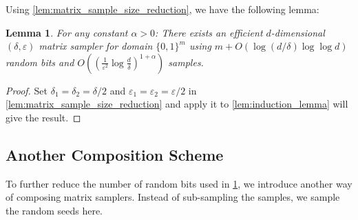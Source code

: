 \documentclass[10pt,a4paper]{article}
\newtheorem{lemma}[theorem]{Lemma}
\newcommand{\eps}{\varepsilon}
\newcommand{\1}{\mathbbm{1}}
\newcommand{\zo}{\{0, 1\}}
\begin{document}
Using \cref{lem:matrix_sample_size_reduction}, we have the following lemma:
\begin{lemma}
    \label{lem:sampler_without_replacement}
    For any constant $\alpha > 0$:
    There exists an efficient $d$-dimensional $(\delta, \eps)$ matrix sampler for domain $\zo^m$ using $m + O(\log(d / \delta) \log\log d)$ random bits and $O((\frac{1}{\eps^2}\log\frac{d}{\delta})^{1 + \alpha})$ samples.
\end{lemma}
\begin{proof}
    Set $\delta_1 = \delta_2 = \delta / 2$ and $\eps_1 = \eps_2 = \eps / 2$ in  \cref{lem:matrix_sample_size_reduction} and apply it to \cref{lem:induction_lemma} will give the result.
\end{proof}
\subsection{Another Composition Scheme}
To further reduce the number of random bits used in \cref{lem:sampler_without_replacement}, we introduce another way of composing matrix samplers. 
Instead of sub-sampling the samples, we sample the random seeds here.

\anotherComposition*
\end{document}
